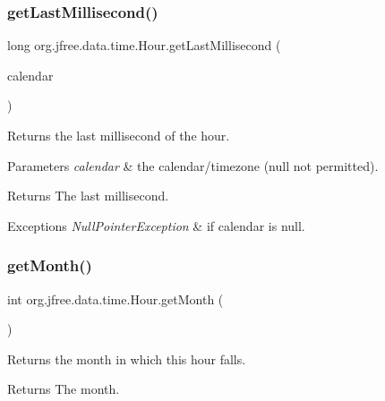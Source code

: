 \subsubsection{\texorpdfstring{get\+Last\+Millisecond()}{getLastMillisecond()}\hspace{0.1cm}{\footnotesize\ttfamily [2/2]}}
{\footnotesize\ttfamily long org.\+jfree.\+data.\+time.\+Hour.\+get\+Last\+Millisecond (\begin{DoxyParamCaption}\item[{Calendar}]{calendar }\end{DoxyParamCaption})}

Returns the last millisecond of the hour.


\begin{DoxyParams}{Parameters}
{\em calendar} & the calendar/timezone ({\ttfamily null} not permitted).\\
\hline
\end{DoxyParams}
\begin{DoxyReturn}{Returns}
The last millisecond.
\end{DoxyReturn}

\begin{DoxyExceptions}{Exceptions}
{\em Null\+Pointer\+Exception} & if {\ttfamily calendar} is {\ttfamily null}. \\
\hline
\end{DoxyExceptions}
\mbox{\label{classorg_1_1jfree_1_1data_1_1time_1_1_hour_aa7f16656095d85ecb6897d59f95d7a6f}} 
\subsubsection{\texorpdfstring{get\+Month()}{getMonth()}}
{\footnotesize\ttfamily int org.\+jfree.\+data.\+time.\+Hour.\+get\+Month (\begin{DoxyParamCaption}{ }\end{DoxyParamCaption})}

Returns the month in which this hour falls.

\begin{DoxyReturn}{Returns}
The month. 
\end{DoxyReturn}
\mbox{\label{classorg_1_1jfree_1_1data_1_1time_1_1_hour_a2666282035106c9e3414eb53dc9a72d4}} 
